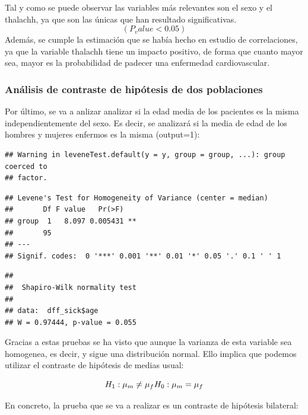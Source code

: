 \documentclass[
]{article}
\begin{document}
Tal y como se puede observar las variables más relevantes son el sexo y
el thalachh, ya que son las únicas que han resultado
significativas.\[(P_value < 0.05)\] Además, se cumple la estimación que
se había hecho en estudio de correlaciones, ya que la variable thalachh
tiene un impacto positivo, de forma que cuanto mayor sea, mayor es la
probabilidad de padecer una enfermedad cardiovascular.

\hypertarget{anuxe1lisis-de-contraste-de-hipuxf3tesis-de-dos-poblaciones}{%
\subsubsection{Análisis de contraste de hipótesis de dos
poblaciones}\label{anuxe1lisis-de-contraste-de-hipuxf3tesis-de-dos-poblaciones}}

Por último, se va a anlizar analizar si la edad media de los pacientes
es la misma independientemente del sexo. Es decir, se analizará si la
media de edad de los hombres y mujeres enfermos es la misma (output=1):

\begin{verbatim}
## Warning in leveneTest.default(y = y, group = group, ...): group coerced to
## factor.
\end{verbatim}

\begin{verbatim}
## Levene's Test for Homogeneity of Variance (center = median)
##       Df F value   Pr(>F)   
## group  1   8.097 0.005431 **
##       95                    
## ---
## Signif. codes:  0 '***' 0.001 '**' 0.01 '*' 0.05 '.' 0.1 ' ' 1
\end{verbatim}

\begin{verbatim}
## 
##  Shapiro-Wilk normality test
## 
## data:  dff_sick$age
## W = 0.97444, p-value = 0.055
\end{verbatim}

Gracias a estas pruebas se ha visto que aunque la varianza de esta
variable sea homogenea, es decir, y sigue una distribución normal. Ello
implica que podemos utilizar el contraste de hipótesis de medias usual:

\[
H_1: \mu_{m}\neq\mu_{f}\\
H_0: \mu_{m}=\mu_{f}
\]

En concreto, la prueba que se va a realizar es un contraste de hipótesis
bilateral:
\end{document}
